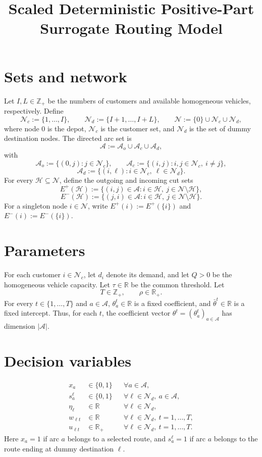 \documentclass[11pt]{article}
\title{Scaled Deterministic Positive-Part Surrogate Routing Model}
\author{}
\date{}
\begin{document}
\maketitle

\section{Sets and network}

Let $I,L\in\mathbb{Z}_{+}$ be the numbers of customers and available homogeneous vehicles, respectively. Define
\[
\mathcal{N}_c:=\{1,\ldots,I\},
\qquad
\mathcal{N}_d:=\{I+1,\ldots,I+L\},
\qquad
\mathcal{N}:=\{0\}\cup\mathcal{N}_c\cup\mathcal{N}_d,
\]
where node $0$ is the depot, $\mathcal{N}_c$ is the customer set, and $\mathcal{N}_d$ is the set of dummy destination nodes. The directed arc set is
\[
\mathcal{A}:=\mathcal{A}_o\cup\mathcal{A}_c\cup\mathcal{A}_d,
\]
with
\[
\mathcal{A}_o:=\{(0,j):j\in\mathcal{N}_c\},
\qquad
\mathcal{A}_c:=\{(i,j):i,j\in\mathcal{N}_c,\ i\neq j\},
\]
\[
\mathcal{A}_d:=\{(i,\ell):i\in\mathcal{N}_c,\ \ell\in\mathcal{N}_d\}.
\]
For every $\mathcal{H}\subseteq\mathcal{N}$, define the outgoing and incoming cut sets
\[
E^+(\mathcal{H})
:=\{(i,j)\in\mathcal{A}:i\in\mathcal{H},\ j\in\mathcal{N}\setminus\mathcal{H}\},
\]
\[
E^-(\mathcal{H})
:=\{(j,i)\in\mathcal{A}:i\in\mathcal{H},\ j\in\mathcal{N}\setminus\mathcal{H}\}.
\]
For a singleton node $i\in\mathcal{N}$, write $E^+(i):=E^+(\{i\})$ and $E^-(i):=E^-(\{i\})$.

\section{Parameters}

For each customer $i\in\mathcal{N}_c$, let $d_i$ denote its demand, and let $Q>0$ be the homogeneous vehicle capacity. Let $\tau\in\mathbb{R}$ be the common threshold. Let
\[
T\in\mathbb{Z}_{+},
\qquad
\rho\in\mathbb{R}_{+}.
\]
For every $t\in\{1,\ldots,T\}$ and $a\in\mathcal{A}$, $\theta_a^t\in\mathbb{R}$ is a fixed coefficient, and $\bar\theta^t\in\mathbb{R}$ is a fixed intercept. Thus, for each $t$, the coefficient vector $\theta^t=(\theta_a^t)_{a\in\mathcal{A}}$ has dimension $|\mathcal{A}|$.

\section{Decision variables}

\begin{align*}
x_a&\in\{0,1\} && \forall a\in\mathcal{A},\\
s_a^\ell&\in\{0,1\} && \forall \ell\in\mathcal{N}_d,\ a\in\mathcal{A},\\
\eta_\ell&\in\mathbb{R} && \forall \ell\in\mathcal{N}_d,\\
w_{\ell t}&\in\mathbb{R} && \forall \ell\in\mathcal{N}_d,\ t=1,\ldots,T,\\
u_{\ell t}&\in\mathbb{R}_{+} && \forall \ell\in\mathcal{N}_d,\ t=1,\ldots,T.
\end{align*}
Here $x_a=1$ if arc $a$ belongs to a selected route, and $s_a^\ell=1$ if arc $a$ belongs to the route ending at dummy destination $\ell$.
\end{document}
